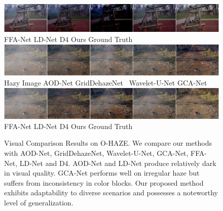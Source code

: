 \documentclass[lettersize,journal]{IEEEtran}
\begin{document}
\begin{figure}[ph!t]
    \includegraphics[width=16.5cm]{ohaze_2_2.jpg} \\
    FFA-Net\cite{qin2020ffa} \qquad\quad\; LD-Net\cite{ullah2021light} \qquad\qquad\; D4\cite{yang2022d4} \qquad\qquad\qquad\; Ours \qquad\qquad\quad Ground Truth \\
    
    \includegraphics[width=16.5cm]{ohaze_3_1.jpg} \\
    Hazy Image\qquad\quad\;\; AOD-Net\cite{li2017aod} \qquad GridDehazeNet\cite{liu2019griddehazenet} \;\, Wavelet-U-Net\cite{yang2019wavelet} \qquad GCA-Net\cite{chen2019gated}\\
    
    \includegraphics[width=16.5cm]{ohaze_3_2.jpg} \\
    FFA-Net\cite{qin2020ffa} \qquad\quad\; LD-Net\cite{ullah2021light} \qquad\qquad\; D4\cite{yang2022d4} \qquad\qquad\qquad\; Ours \qquad\qquad\quad Ground Truth \\
    
    \caption{Visual Comparison Results on O-HAZE. We compare our methods with AOD-Net\cite{li2017aod}, GridDehazeNet\cite{liu2019griddehazenet}, Wavelet-U-Net\cite{yang2019wavelet}, GCA-Net\cite{chen2019gated}, FFA-Net\cite{qin2020ffa}, LD-Net\cite{ullah2021light} and D4\cite{yang2022d4}. AOD-Net and LD-Net produce relatively dark in visual quality. GCA-Net performs well on irregular haze but suffers from inconsistency in color blocks. Our proposed method exhibits adaptability to diverse scenarios and possesses a noteworthy level of generalization. }
    \label{ohaze}
\end{figure}
\end{document}
